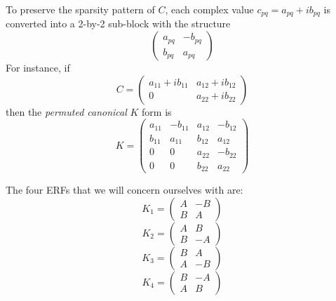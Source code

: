 \documentclass{report}
\begin{document}
To preserve the sparsity pattern of $C$, each complex value $c_{pq} =
a_{pq} + ib_{pq}$ is converted into a 2-by-2 sub-block with the structure
\begin{equation*} \left( \begin{array}{rr} a_{pq} & -b_{pq} \\ b_{pq} &
a_{pq} \end{array} \right) \end{equation*}
For instance, if
\begin{equation*} C = \left( \begin{array}{cc} a_{11} + i b_{11} & a_{12}
+ i b_{12} \\ 0 & a_{22} + i b_{22} \end{array} \right) \end{equation*}
then the \emph{permuted canonical} $K$ form is
\begin{equation*} K = \left( \begin{array}{cccc} a_{11} & -b_{11} &
a_{12} & -b_{12} \\ b_{11} & a_{11} & b_{12} & a_{12} \\ 0 & 0 & a_{22} &
-b_{22} \\ 0 & 0 & b_{22} & a_{22} \end{array} \right) \end{equation*}

The four ERFs that we will concern ourselves with are:
\begin{equation*} K_1 = \left( \begin{array}{rr} A & -B \\ B & A
\end{array} \right) \end{equation*}
\begin{equation*} K_2 = \left( \begin{array}{rr} A & B \\ B & -A
\end{array} \right) \end{equation*}
\begin{equation*} K_3 = \left( \begin{array}{rr} B & A \\ A & -B
\end{array} \right) \end{equation*}
\begin{equation*} K_4 = \left( \begin{array}{rr} B & -A \\ A & B
\end{array} \right) \end{equation*}
\end{document}
